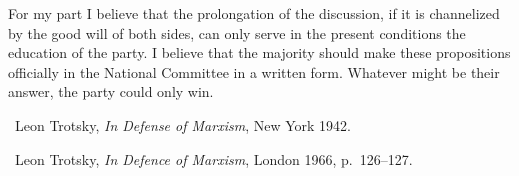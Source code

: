 For my part I believe that the prolongation of the discussion, if it is channelized by the good will of both sides, can only serve in the present conditions the education of the party. I believe that the majority should make these propositions officially in the National Committee in a written form. Whatever might be their answer, the party could only win.


\begin{letterinfo}
	\firstpublished\ Leon Trotsky, \emph{In Defense of Marxism}, New York 1942.
	
	\checkedagainst\ Leon Trotsky, \emph{In Defence of Marxism}, London 1966, p.~126--127.
	
	\footnoteslatter
\end{letterinfo}